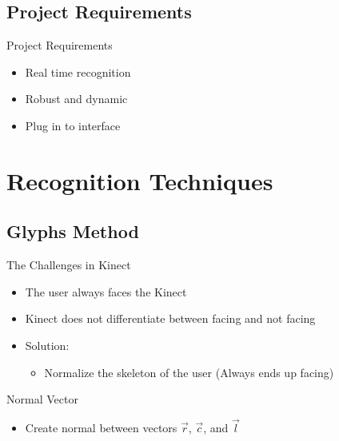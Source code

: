 \documentclass{beamer}
\begin{document}
\subsection{Project Requirements}

\begin{frame}{Project Requirements}
 \begin{itemize}
  \item Real time recognition
  \item Robust and dynamic
  \item Plug in to interface
 \end{itemize}
\end{frame}

\section{Recognition Techniques}
\subsection{Glyphs Method}

\begin{frame}{The Challenges in Kinect}
 \begin{itemize}
  \item The user always faces the Kinect
  \item Kinect does not differentiate between facing and not facing
  \item Solution:
   \begin{itemize}
    \item Normalize the skeleton of the user (Always ends up facing)
   \end{itemize}
 \end{itemize}
\end{frame}

\begin{frame}{Normal Vector}
 \begin{itemize}
  \item Create normal between vectors $\vec{r}$, $\vec{c}$, and $\vec{l}$
 \end{itemize}
 \pause
 \end{frame}
\end{document}
